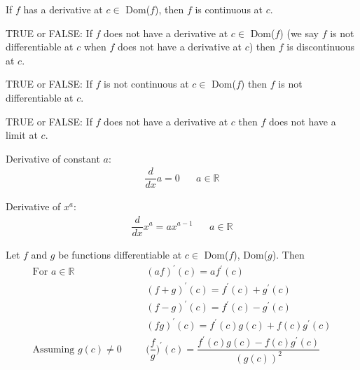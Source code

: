 \begin{theorem}
If $f$ has a derivative at $c \in$ Dom($f$), then $f$ is continuous at $c$.
\end{theorem}

\begin{exercise}
TRUE or FALSE: If $f$ does not have a derivative at $c \in$ Dom($f$) (we say $f$ is not differentiable at $c$ when $f$ does not have a derivative at $c$) then $f$ is discontinuous at $c$.
\end{exercise}

\begin{exercise}
TRUE or FALSE: If $f$ is not continuous at $c \in$ Dom($f$)  then $f$ is not differentiable at $c$.
\end{exercise}

\begin{exercise}
TRUE or FALSE: If $f$ does not have a derivative at $c$ then $f$ does not have a limit at $c$.
\end{exercise}

\begin{theorem}
Derivative of constant $a$:
\begin{align*}
    \dfrac{d}{dx}a = 0 \hspace{20pt} a \in \mathbb{R}
\end{align*}
\end{theorem}

\begin{theorem}
Derivative of $x^{a}$:
\begin{align*}
    \dfrac{d}{dx}x^{a} = ax^{a-1} \hspace{20pt} a \in \mathbb{R}
\end{align*}
\end{theorem}

\begin{theorem}
Let $f$ and $g$ be functions differentiable at $c \in$ Dom($f$), Dom($g$). Then
\begin{align*}
    \text{For $a \in \mathbb{R}$} \hspace{20pt} &(af)^{'}(c) = af^{'}(c)\\[2ex]
    &(f+g)^{'}(c) = f^{'}(c) + g^{'}(c)\\[2ex]
    &(f-g)^{'}(c) = f^{'}(c) - g^{'}(c)\\[2ex]
    &(fg)^{'}(c) = f^{'}(c)g(c) + f(c)g^{'}(c)\\[2ex]
    \text{Assuming $g(c) \neq 0$} \hspace{20pt} &\Big(\dfrac{f}{g}\Big)^{'}(c) = \dfrac{f^{'}(c)g(c) - f(c)g^{'}(c)}{(g(c))^{2}}
\end{align*}
\end{theorem}

